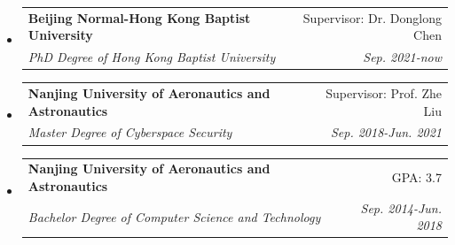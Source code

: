 \documentclass[letterpaper,11pt]{article}
\makeatletter
\newcommand{\resitem}[1]{\item #1 \vspace{-2pt}}
\newcommand{\ressubheading}[4]{
\begin{tabular*}{6.5in}{l@{\cftdotfill{\cftsecdotsep}\extracolsep{\fill}}r}
		\textbf{#1} & #2 \\
		\textit{#3} & \textit{#4} \\
\end{tabular*}\vspace{-6pt}}
\makeatother
\begin{document}
\begin{itemize}
\item
	\ressubheading{Beijing Normal-Hong Kong Baptist University}{Supervisor: Dr. Donglong Chen}{PhD Degree of Hong Kong Baptist University}{Sep. 2021-now}
%
\item
	\ressubheading{Nanjing University of Aeronautics and Astronautics}{Supervisor: Prof. Zhe Liu}{Master Degree of Cyberspace Security}{Sep. 2018-Jun. 2021}
%

\item
	\ressubheading{Nanjing University of Aeronautics and Astronautics}{GPA: 3.7}{Bachelor Degree of Computer Science and Technology}{Sep. 2014-Jun. 2018}
%

\end{itemize}

%
\end{document}
